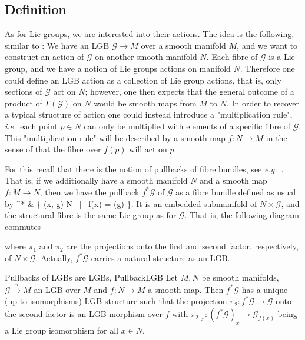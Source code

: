 \documentclass[a4paper,oneside,11pt,bibliography=totoc]{scrartcl}
\def\ba#1\ea{\begin{align}#1\end{align}}
\theoremstyle{plain}
\theoremstyle{remark}
\theoremstyle{definition}
\begin{document}
\subsection{Definition}

As for Lie groups, we are interested into their actions. The idea is the following, similar to \cite[\S 1.6, discussion around Def.\ 1.6.1, page 34]{mackenzieGeneralTheory}: We have an LGB $\mathcal{G} \to M$ over a smooth manifold $M$, and we want to construct an action of $\mathcal{G}$ on another smooth manifold $N$. Each fibre of $\mathcal{G}$ is a Lie group, and we have a notion of Lie groups actions on manifold $N$. Therefore one could define an LGB action as a collection of Lie group actions, that is, only sections of $\mathcal{G}$ act on $N$; however, one then expects that the general outcome of a product of $\Gamma(\mathcal{G})$ on $N$ would be smooth maps from $M$ to $N$. In order to recover a typical structure of action one could instead introduce a "multiplication rule", \textit{i.e.}~each point $p \in N$ can only be multiplied with elements of a specific fibre of $\mathcal{G}$. This "multiplication rule" will be described by a smooth map $f: N \to M$ in the sense of that the fibre over $f(p)$ will act on $p$.

For this recall that there is the notion of pullbacks of fibre bundles, see \textit{e.g.}\ \cite[\S 4.1.4, page 203ff.; especially Thm.\ 4.1.17, page 204f.]{Hamilton}. That is, if we additionally have a smooth manifold $N$ and a smooth map $f: M \to N$, then we have the pullback $f^*\mathcal{G}$ of $\mathcal{G}$ as a fibre bundle defined as usual by
\ba
f^*
&\coloneqq
\left\{
	(x, g) \in N \times {} ~\middle|~
	f(x) = \pi(g)
\right\}.
\ea
It is an embedded submanifold of $N \times \mathcal{G}$, and the structural fibre is the same Lie group as for $\mathcal{G}$.
That is, the following diagram commutes
\begin{center}
\end{center}
where $\pi_1$ and $\pi_2$ are the projections onto the first and second factor, respectively, of $N \times \mathcal{G}$. Actually, $f^*\mathcal{G}$ carries a natural structure as an LGB.

\begin{corollaries}{Pullbacks of LGBs are LGBs, \newline \cite[\S 2.3, simplified situation of the discussion around Prop.\ 2.3.1, page 63ff.]{mackenzieGeneralTheory}}{PullbackLGB}
Let $M, N$ be smooth manifolds, $\mathcal{G} \stackrel{\pi}{\to} M$ an LGB over $M$ and $f: N \to M$ a smooth map. Then $f^*\mathcal{G}$ has a unique (up to isomorphisms) LGB structure such that the projection $\pi_2: f^*\mathcal{G} \to \mathcal{G}$ onto the second factor is an LGB morphism over $f$ with $\pi_2|_x: (f^*\mathcal{G})_x \to \mathcal{G}_{f(x)}$ being a Lie group isomorphism for all $x \in N$.
%
\end{corollaries}
\end{document}

